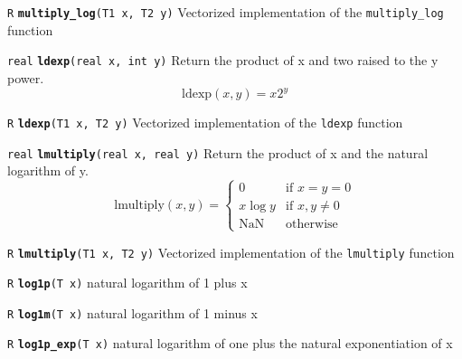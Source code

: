\documentclass[
  10pt,
]{book}
\begin{document}

\texttt{R} \textbf{\texttt{multiply\_log}}\texttt{(T1\ x,\ T2\ y)}\newline
Vectorized implementation of the \texttt{multiply\_log} function


\texttt{real} \textbf{\texttt{ldexp}}\texttt{(real\ x,\ int\ y)}\newline
Return the product of x and two raised to the y power. \[
\text{ldexp}(x,y) = x 2^y  \]


\texttt{R} \textbf{\texttt{ldexp}}\texttt{(T1\ x,\ T2\ y)}\newline
Vectorized implementation of the \texttt{ldexp} function


\texttt{real} \textbf{\texttt{lmultiply}}\texttt{(real\ x,\ real\ y)}\newline
Return the product of x and the natural logarithm of y. \[
\text{lmultiply}(x,y) = \begin{cases} 0 & \text{if } x = y = 0 \\ x
\log y & \text{if } x, y \neq 0 \\ \text{NaN} & \text{otherwise}
\end{cases} \]


\texttt{R} \textbf{\texttt{lmultiply}}\texttt{(T1\ x,\ T2\ y)}\newline
Vectorized implementation of the \texttt{lmultiply} function


\texttt{R} \textbf{\texttt{log1p}}\texttt{(T\ x)}\newline
natural logarithm of 1 plus x


\texttt{R} \textbf{\texttt{log1m}}\texttt{(T\ x)}\newline
natural logarithm of 1 minus x


\texttt{R} \textbf{\texttt{log1p\_exp}}\texttt{(T\ x)}\newline
natural logarithm of one plus the natural exponentiation of x
\end{document}
